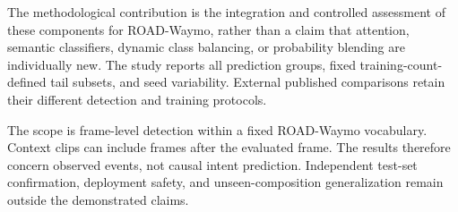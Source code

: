 The methodological contribution is the integration and controlled assessment of these components for ROAD-Waymo, rather than a claim that attention, semantic classifiers, dynamic class balancing, or probability blending are individually new. The study reports all prediction groups, fixed training-count-defined tail subsets, and seed variability. External published comparisons retain their different detection and training protocols.

The scope is frame-level detection within a fixed ROAD-Waymo vocabulary. Context clips can include frames after the evaluated frame. The results therefore concern observed events, not causal intent prediction. Independent test-set confirmation, deployment safety, and unseen-composition generalization remain outside the demonstrated claims.
